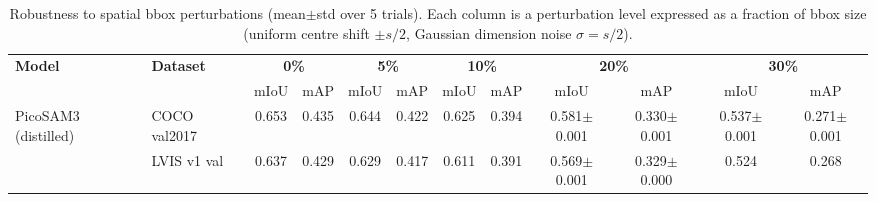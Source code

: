 \begin{table}[ht]
  \centering
  \small
  \caption{Robustness to spatial bbox perturbations (mean$\pm$std over 5 trials). Each column is a perturbation level expressed as a fraction of bbox size (uniform centre shift $\pm s/2$, Gaussian dimension noise $\sigma=s/2$).}
  \label{tab:spatial_robustness}
  \setlength{\tabcolsep}{4pt}
  \begin{tabular}{llcccccccccc}
    \toprule
    \textbf{Model} & \textbf{Dataset} & \multicolumn{2}{c}{\textbf{0\%}} & \multicolumn{2}{c}{\textbf{5\%}} & \multicolumn{2}{c}{\textbf{10\%}} & \multicolumn{2}{c}{\textbf{20\%}} & \multicolumn{2}{c}{\textbf{30\%}} \\
    \cmidrule(lr){3-4} \cmidrule(lr){5-6} \cmidrule(lr){7-8} \cmidrule(lr){9-10} \cmidrule(lr){11-12}
    & & mIoU & mAP & mIoU & mAP & mIoU & mAP & mIoU & mAP & mIoU & mAP \\
    \midrule
    \multirow{2}{*}{PicoSAM3 (distilled)} & COCO val2017 & 0.653 & 0.435 & 0.644 & 0.422 & 0.625 & 0.394 & 0.581{\tiny$\pm$0.001} & 0.330{\tiny$\pm$0.001} & 0.537{\tiny$\pm$0.001} & 0.271{\tiny$\pm$0.001} \\
     & LVIS v1 val & 0.637 & 0.429 & 0.629 & 0.417 & 0.611 & 0.391 & 0.569{\tiny$\pm$0.001} & 0.329{\tiny$\pm$0.000} & 0.524 & 0.268 \\
    \bottomrule
  \end{tabular}
\end{table}
